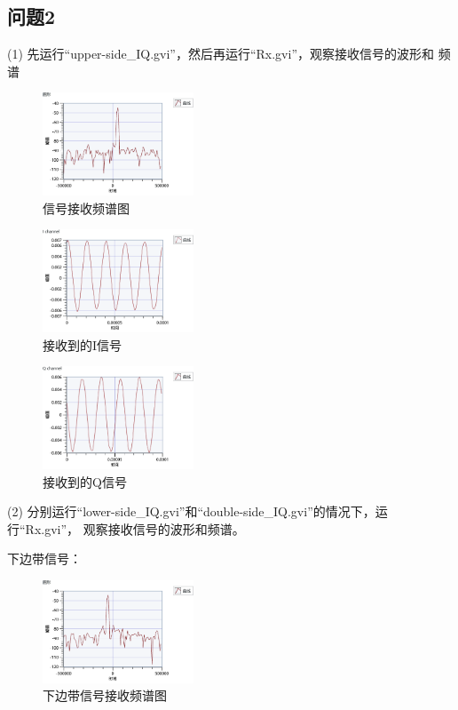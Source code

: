 \documentclass{../source/Experiment}
\begin{document}
\subsection{问题2}
(1) 先运行“upper-side\_IQ.gvi”，然后再运行“Rx.gvi”，观察接收信号的波形和 频谱
\begin{figure}[H]
    \centering
    \includegraphics[width = 0.4\textwidth]{lab9/UPPER.png}
    \caption{信号接收频谱图}
\end{figure}
\begin{figure}[H]
    \centering
    \includegraphics[width = 0.4\textwidth]{lab9/UPPER_I.png}
    \caption{接收到的I信号}
\end{figure}
\begin{figure}[H]
    \centering
    \includegraphics[width = 0.4\textwidth]{lab9/UPPER_Q.png}
    \caption{接收到的Q信号}
\end{figure}

(2) 分别运行“lower-side\_IQ.gvi”和“double-side\_IQ.gvi”的情况下，运行“Rx.gvi”， 观察接收信号的波形和频谱。

下边带信号：
\begin{figure}[H]
    \centering
    \includegraphics[width = 0.4\textwidth]{lab9/LOWER.png}
    \caption{下边带信号接收频谱图}
\end{figure}
\end{document}
